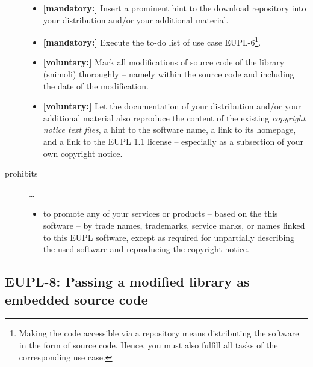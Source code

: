\begin{description}
\begin{itemize}
  \item \textbf{[mandatory:]} Insert a prominent hint to the download repository
  into your distribution and/or your additional material.

  \item \textbf{[mandatory:]} Execute the to-do list of use case EUPL-6\footnote{
  Making the code accessible via a repository means distributing the software in
  the form of source code. Hence, you must also fulfill all tasks of the
  corresponding use case.}.
    
  \item \textbf{[voluntary:]} Mark all modifications of source code of the
  library (snimoli) thoroughly -- namely within the source code and including
  the date of the modification.
  
  \item \textbf{[voluntary:]} Let the documentation of your distribution and/or
  your additional material  also reproduce the content of the existing
  \emph{copyright notice text files}, a hint to the software name, a link to its
  homepage, and a link to the EUPL 1.1 license -- especially as a subsection of
  your own copyright notice.
  
\end{itemize}

\item[prohibits] \ldots
\begin{itemize}
  \item to promote any of your services or products -- based on the this software
  -- by trade names, trademarks, service marks, or names linked to this EUPL
  software, except as required for unpartially describing the used software and
  reproducing the copyright notice.
\end{itemize}

\end{description}

\subsection{EUPL-8: Passing a modified library as embedded source code}
\label{OSUC-10-EUPL}

